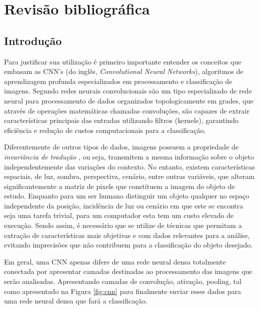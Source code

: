 \documentclass[12pt]{article}
\begin{document}
\section{Revisão bibliográfica}

\subsection{Introdução}
Para justificar sua utilização é primeiro importante entender os conceitos que embasam as CNN's (do inglês, {\it Convolutional Neural Networks}), algoritmos de aprendizagem profunda especializados em processamento e classificação de imagens. Segundo \cite{Goodfellow-et-al-2016} redes neurais convolucionais são um tipo especializado de rede neural para processamento de dados organizados topologicamente em grades, que através de operações matemáticas chamadas convoluções, são capazes de extrair características principais das entradas utilizando filtros (kernels), garantindo eficiência e redução de custos computacionais para a classificação.

Diferentemente de outros tipos de dados, imagens possuem a propriedade de {\it invariância de tradução} \cite{Aggarwal18}, ou seja, transmitem a mesma informação sobre o objeto independentemente das variações do contexto. No entanto, existem características espaciais, de luz, sombra, perspectiva, cenário, entre outras variáveis, que alteram significantemente a matriz de pixels que constituem a imagem do objeto de estudo. Enquanto para um ser humano distinguir um objeto qualquer no espaço independente da posição, incidência de luz ou cenário em que este se encontra seja uma tarefa trivial, para um computador esta tem um custo elevado de execução. Sendo assim, é necessário que se utilize de técnicas que permitam a extração de características mais objetivas e com dados relevantes para a análise, evitando imprecisões que não contribuem para a classificação do objeto desejado.

Em geral, uma CNN apenas difere de uma rede neural densa totalmente conectada por apresentar camadas destinadas ao processamento das imagens que serão analisadas. Apresentando camadas de convolução, ativação, pooling, tal como apresentado na Figura \ref{fig:cnn} para finalmente enviar esses dados para uma rede neural densa que fará a classificação.
\end{document}
